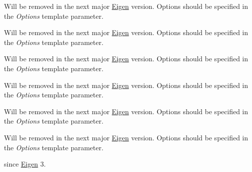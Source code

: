 \begin{DoxyRefList}
\label{deprecated__deprecated000403}%
%
  
\item[Member \mbox{\hyperlink{class_eigen_1_1_b_d_c_s_v_d_a65b127dc52d97454f1a79c43ffd5e524}{Eigen::B\+D\+C\+S\+VD::B\+D\+C\+S\+VD}} (Index rows, Index cols, unsigned int computation\+Options)]\label{deprecated__deprecated000365}%
%
Will be removed in the next major \mbox{\hyperlink{namespace_eigen}{Eigen}} version. Options should be specified in the {\itshape Options} template parameter. 

\label{deprecated__deprecated000407}%
%
Will be removed in the next major \mbox{\hyperlink{namespace_eigen}{Eigen}} version. Options should be specified in the {\itshape Options} template parameter.  
\item[Member \mbox{\hyperlink{class_eigen_1_1_b_d_c_s_v_d_a5ad3c050a21f1e4495a2342238e0eff5}{Eigen::B\+D\+C\+S\+VD::B\+D\+C\+S\+VD}} (const Matrix\+Type \&matrix, unsigned int computation\+Options)]\label{deprecated__deprecated000366}%
%
Will be removed in the next major \mbox{\hyperlink{namespace_eigen}{Eigen}} version. Options should be specified in the {\itshape Options} template parameter. 

\label{deprecated__deprecated000408}%
%
Will be removed in the next major \mbox{\hyperlink{namespace_eigen}{Eigen}} version. Options should be specified in the {\itshape Options} template parameter.  
\item[Member \mbox{\hyperlink{class_eigen_1_1_b_d_c_s_v_d_a336a23fd966bf4f64a42beed818d1651}{Eigen::B\+D\+C\+S\+VD::compute}} (const Matrix\+Type \&matrix, unsigned int computation\+Options)]\label{deprecated__deprecated000367}%
%
Will be removed in the next major \mbox{\hyperlink{namespace_eigen}{Eigen}} version. Options should be specified in the {\itshape Options} template parameter. 

\label{deprecated__deprecated000409}%
%
Will be removed in the next major \mbox{\hyperlink{namespace_eigen}{Eigen}} version. Options should be specified in the {\itshape Options} template parameter.  
\item[Member \mbox{\hyperlink{class_eigen_1_1_complex_eigen_solver_a8bd6f818f11487fa2eb4b01cb920ace6}{Eigen::Complex\+Eigen\+Solver$<$ Matrix\+Type\+\_\+ $>$::Index}} ]\label{deprecated__deprecated000344}%
%
since \mbox{\hyperlink{namespace_eigen}{Eigen}} 3. 


\end{DoxyRefList}
